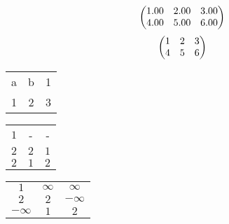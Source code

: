 \begin{align*}
  \begin{pmatrix}
    $1.00$ & $2.00$ & $3.00$\\
    $4.00$ & $5.00$ & $6.00$\\
  \end{pmatrix}
\end{align*}
\begin{align*}
  \begin{pmatrix}
    $1$ & $2$ & $3$\\
    $4$ & $5$ & $6$\\
  \end{pmatrix}
\end{align*}
\begin{table}[htp]
  \begin{center}
    \begin{tabular}{ccc}
      \toprule
      a & b & 1\\
      1 & 2 & 3\\
      \bottomrule
    \end{tabular}
  \end{center}
\end{table}
\begin{table}[htp]
  \begin{center}
    \begin{tabular}{ccc}
      \toprule
      $1$ & {-} & {-}\\
      $2$ & $2$ & $1$\\
      $2$ & $1$ & $2$\\
      \bottomrule
    \end{tabular}
  \end{center}
\end{table}
\begin{table}[htp]
  \begin{center}
    \begin{tabular}{ccc}
      \toprule
      $1$ & $\infty$ & $\infty$\\
      $2$ & $2$ & $-\infty$\\
      $-\infty$ & $1$ & $2$\\
      \bottomrule
    \end{tabular}
  \end{center}
\end{table}
\begin{table}[htp]
  \begin{center}
    \begin{tabular}{c}
      \toprule
      \bottomrule
    \end{tabular}
  \end{center}
\end{table}
